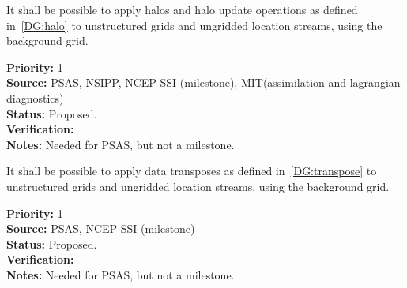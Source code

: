 
It shall be possible to apply halos and halo update operations as
defined in~\ref{DG:halo} to unstructured grids and ungridded location
streams, using the background grid.

\begin{reqlist}
{\bf Priority:} 1 \\ 
{\bf Source:} PSAS, NSIPP, NCEP-SSI (milestone), MIT(assimilation and lagrangian diagnostics) \\
{\bf Status:} Proposed. \\
{\bf Verification:} \\
{\bf Notes:} Needed for PSAS, but not a milestone.
\end{reqlist}


It shall be possible to apply data transposes as defined
in~\ref{DG:transpose} to unstructured grids and ungridded location
streams, using the background grid.

\begin{reqlist}
{\bf Priority:} 1 \\ 
{\bf Source:} PSAS, NCEP-SSI (milestone) \\
{\bf Status:} Proposed. \\
{\bf Verification:} \\
{\bf Notes:} Needed for PSAS, but not a milestone.
\end{reqlist}









